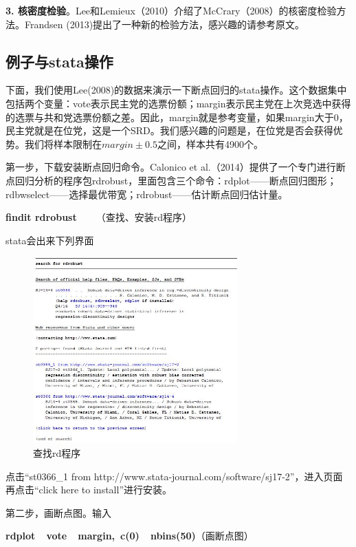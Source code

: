 \documentclass[cn,10pt,math=newtx,citestyle=gb7714-2015,bibstyle=gb7714-2015]{elegantbook}
\begin{document}
	\textbf{3. 核密度检验}。Lee和Lemieux（2010）介绍了McCrary（2008）的核密度检验方法。Frandsen (2013)提出了一种新的检验方法，感兴趣的请参考原文。
	
	\subsection{例子与stata操作}
	
	下面，我们使用Lee(2008)的数据来演示一下断点回归的stata操作。这个数据集中包括两个变量：vote表示民主党的选票份额；margin表示民主党在上次竞选中获得的选票与共和党选票份额之差。因此，margin就是参考变量，如果margin大于0，民主党就是在位党，这是一个SRD。我们感兴趣的问题是，在位党是否会获得优势。我们将样本限制在$margin\pm0.5$之间，样本共有4900个。
	
	第一步，下载安装断点回归命令。Calonico et al.（2014）提供了一个专门进行断点回归分析的程序包rdrobust，里面包含三个命令：rdplot——断点回归图形；rdbwselect——选择最优带宽；rdrobust——估计断点回归估计量。
	
	\textbf{findit rdrobust}~~~~（查找、安装rd程序）
	
	stata会出来下列界面
	
	\begin{figure}[htbp]
		\centering
		\includegraphics[width=0.7\textwidth]{findit.jpg}
		\caption{查找rd程序}\label{fig:digit}
	\end{figure}
	
	点击“st0366\_1 from http://www.stata-journal.com/software/sj17-2”，进入页面再点击“click here to install”进行安装。
	
	第二步，画断点图。输入
	
	\textbf{rdplot~~vote~~margin,~c(0)~~nbins(50)}（画断点图）
	
\end{document}
